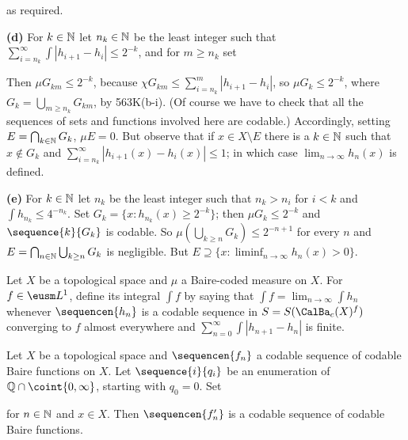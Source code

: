 {\noindent as required.

\medskip

{\bf (d)} For $k\in\Bbb N$ let $n_k\in\Bbb N$ be the least integer
such that
$\sum_{i=n_k}^{\infty}\int|h_{i+1}-h_i|\le 2^{-k}$, and for $m\ge n_k$ set


\noindent Then $\mu G_{km}\le 2^{-k}$, because
$\chi G_{km}\le\sum_{i=n_k}^m|h_{i+1}-h_i|$, so
$\mu G_k\le 2^{-k}$, where $G_k=\bigcup_{m\ge n_k}G_{km}$, by 563K(b-i).
(Of course we have to check that all the sequences of sets and functions
involved here are codable.)   Accordingly,
setting $E=\bigcap_{k\in\Bbb N}G_k$, $\mu E=0$.   But observe
that if $x\in X\setminus E$ there is a $k\in\Bbb N$ such that
$x\notin G_k$ and $\sum_{i=n_k}^{\infty}|h_{i+1}(x)-h_i(x)|\le 1$;
in which case $\lim_{n\to\infty}h_n(x)$ is defined.


\medskip

{\bf (e)} For $k\in\Bbb N$ let $n_k$ be the least integer such that
$n_k>n_i$ for $i<k$ and $\int h_{n_k}\le 4^{-n_k}$.   Set
$G_k=\{x:h_{n_k}(x)\ge 2^{-k}\}$;  then $\mu G_k\le 2^{-k}$ and
$\sequence{k}{G_k}$ is codable.   So
$\mu(\bigcup_{k\ge n}G_k)\le 2^{-n+1}$ for every $n$ and
$E=\bigcap_{n\in\Bbb N}\bigcup_{k\ge n}G_k$ is negligible.   But
$E\supseteq\{x:\liminf_{n\to\infty}h_n(x)>0\}$.
}%

 Let $X$ be a topological space and $\mu$ a
Baire-coded measure on $X$.   For $f\in\eusm L^1$, define its integral
$\int f$ by saying that $\int f=\lim_{n\to\infty}\int h_n$ whenever
$\sequencen{h_n}$ is a codable sequence in $S=S(\CalBa_c(X)^f)$ converging to $f$ almost
everywhere and $\sum_{n=0}^{\infty}\int|h_{n+1}-h_n|$ is finite.

 Let $X$ be a topological space and $\sequencen{f_n}$ a
codable sequence of codable Baire functions on $X$.
Let $\sequence{i}{q_i}$ be an enumeration of $\Bbb Q\cap\coint{0,\infty}$,
starting with $q_0=0$.   Set


\noindent for $n\in\Bbb N$ and $x\in X$.   Then $\sequencen{f'_n}$ is a
codable sequence of codable Baire functions.

